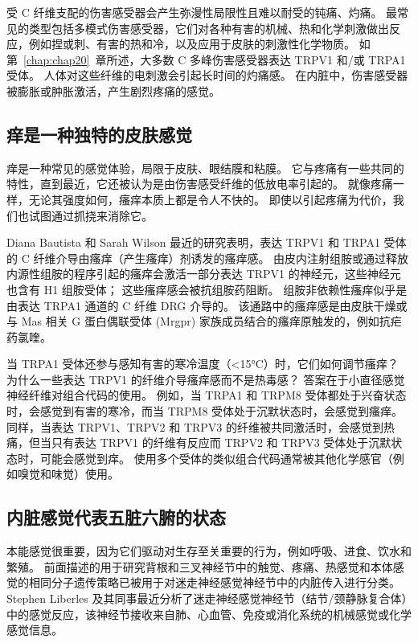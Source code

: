受 C 纤维支配的伤害感受器会产生弥漫性局限性且难以耐受的钝痛、灼痛。
最常见的类型包括多模式伤害感受器，它们对各种有害的机械、热和化学刺激做出反应，例如捏或刺、有害的热和冷，以及应用于皮肤的刺激性化学物质。
如第~\ref{chap:chap20}~章所述，大多数 C 多峰伤害感受器表达 TRPV1 和/或 TRPA1 受体。
人体对这些纤维的电刺激会引起长时间的灼痛感。
在内脏中，伤害感受器被膨胀或肿胀激活，产生剧烈疼痛的感觉。



\subsection{痒是一种独特的皮肤感觉}

痒是一种常见的感觉体验，局限于皮肤、眼结膜和粘膜。 
它与疼痛有一些共同的特性，直到最近，它还被认为是由伤害感受纤维的低放电率引起的。
就像疼痛一样，无论其强度如何，瘙痒本质上都是令人不快的。
即使以引起疼痛为代价，我们也试图通过抓挠来消除它。


Diana Bautista 和 Sarah Wilson 最近的研究表明，表达 TRPV1 和 TRPA1 受体的 C 纤维介导由瘙痒（产生瘙痒）剂诱发的瘙痒感。
由皮内注射组胺或通过释放内源性组胺的程序引起的瘙痒会激活一部分表达 TRPV1 的神经元，这些神经元也含有 H1 组胺受体；
这些瘙痒感会被抗组胺药阻断。
组胺非依赖性瘙痒似乎是由表达 TRPA1 通道的 C 纤维 DRG 介导的。
该通路中的瘙痒感是由皮肤干燥或与 Mas 相关 G 蛋白偶联受体 (Mrgpr) 家族成员结合的瘙痒原触发的，例如抗疟药氯喹。


当 TRPA1 受体还参与感知有害的寒冷温度（<15°C）时，它们如何调节瘙痒？
为什么一些表达 TRPV1 的纤维介导瘙痒感而不是热毒感？
答案在于小直径感觉神经纤维对组合代码的使用。
例如，当 TRPA1 和 TRPM8 受体都处于兴奋状态时，会感觉到有害的寒冷，而当 TRPM8 受体处于沉默状态时，会感觉到瘙痒。
同样，当表达 TRPV1、TRPV2 和 TRPV3 的纤维被共同激活时，会感觉到热痛，但当只有表达 TRPV1 的纤维有反应而 TRPV2 和 TRPV3 受体处于沉默状态时，可能会感觉到痒。
使用多个受体的类似组合代码通常被其他化学感官（例如嗅觉和味觉）使用。



\subsection{内脏感觉代表五脏六腑的状态}

本能感觉很重要，因为它们驱动对生存至关重要的行为，例如呼吸、进食、饮水和繁殖。
前面描述的用于研究背根和三叉神经节中的触觉、疼痛、热感觉和本体感觉的相同分子遗传策略已被用于对迷走神经感觉神经节中的内脏传入进行分类。
Stephen Liberles 及其同事最近分析了迷走神经感觉神经节（结节/颈静脉复合体）中的感觉反应，该神经节接收来自肺、心血管、免疫或消化系统的机械感觉或化学感觉信息。


